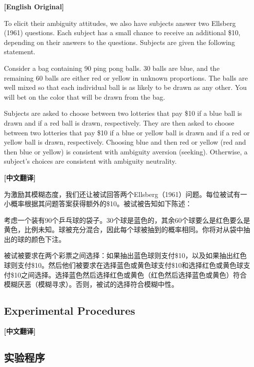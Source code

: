 \documentclass[12pt,a4paper]{ctexart}
\newenvironment{original}{%
  \par\medskip\noindent\textbf{[English Original]}\par\smallskip
  \color{black}\small
}{%
  \par\medskip
}
\newenvironment{translation}{%
  \par\noindent\textbf{[中文翻译]}\par\smallskip
  \color{blue}\small
}{%
  \par\bigskip
}
\theoremstyle{definition}
\theoremstyle{remark}
\begin{document}
\begin{original}
To elicit their ambiguity attitudes, we also have subjects answer two Ellsberg (1961) questions. Each subject has a small chance to receive an additional \$10, depending on their answers to the questions. Subjects are given the following statement.

Consider a bag containing 90 ping pong balls. 30 balls are blue, and the remaining 60 balls are either red or yellow in unknown proportions. The balls are well mixed so that each individual ball is as likely to be drawn as any other. You will bet on the color that will be drawn from the bag.

Subjects are asked to choose between two lotteries that pay \$10 if a blue ball is drawn and if a red ball is drawn, respectively. They are then asked to choose between two lotteries that pay \$10 if a blue or yellow ball is drawn and if a red or yellow ball is drawn, respectively. Choosing blue and then red or yellow (red and then blue or yellow) is consistent with ambiguity aversion (seeking). Otherwise, a subject's choices are consistent with ambiguity neutrality.
\end{original}
\begin{translation}
为激励其模糊态度，我们还让被试回答两个Ellsberg（1961）问题。每位被试有一小概率根据其问题答案获得额外的\$10。被试被告知如下陈述：

考虑一个装有90个乒乓球的袋子。30个球是蓝色的，其余60个球要么是红色要么是黄色，比例未知。球被充分混合，因此每个球被抽到的概率相同。你将对从袋中抽出的球的颜色下注。

被试被要求在两个彩票之间选择：如果抽出蓝色球则支付\$10，以及如果抽出红色球则支付\$10。然后他们被要求在选择蓝色或黄色球支付\$10和选择红色或黄色球支付\$10之间选择。选择蓝色然后选择红色或黄色（红色然后选择蓝色或黄色）符合模糊厌恶（模糊寻求）。否则，被试的选择符合模糊中性。
\end{translation}

\subsection{Experimental Procedures}
\begin{translation}
\subsection*{实验程序}
\end{translation}
\end{document}
